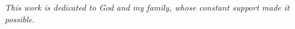 \documentclass[
12pt,		%
openright,	%
twoside,  %
a4paper,			%
chapter=TITLE,		%
english,			%
french,				%
spanish,			%
brazil				%
]{USPSC}
\begin{document}
% 	
% 		
% 
% 




%



\begin{dedicatoria}
   \vspace*{\fill}
   \centering
   \noindent
   \textit{ This work is dedicated to God and my family, whose constant support made it possible.} \vspace*{\fill}
\end{dedicatoria}
\end{document}
